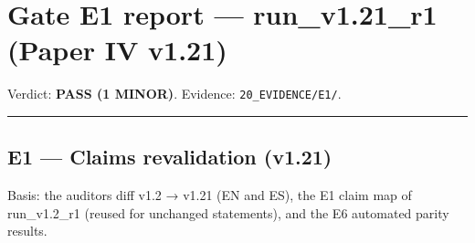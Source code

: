 \documentclass[
]{article}
\author{}
\date{}
\begin{document}
\section{Gate E1 report --- run\_v1.21\_r1 (Paper IV
v1.21)}\label{gate-e1-report--run_v121_r1-paper-iv-v121}

Verdict: \textbf{PASS (1 MINOR)}. Evidence: \texttt{20\_EVIDENCE/E1/}.

\begin{center}\rule{0.5\linewidth}{0.5pt}\end{center}

\subsection{E1 --- Claims revalidation
(v1.21)}\label{e1--claims-revalidation-v121}

Basis: the auditor\textquotesingle s diff v1.2 → v1.21 (EN and ES), the
E1 claim map of run\_v1.2\_r1 (reused for unchanged statements), and the
E6 automated parity results.
\end{document}
